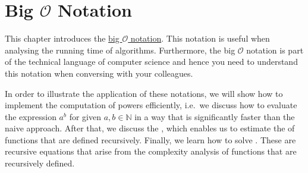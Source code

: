 \chapter{Big $\mathcal{O}$ Notation} 
This chapter introduces the
\href{http://en.wikipedia.org/wiki/O_notation}{big $\mathcal{O}$ notation}. 
This  notation is useful when analysing the running time of algorithms.  Furthermore, the big $\mathcal{O}$
notation is part of the technical language of computer science and hence you need to understand this notation
when conversing with your colleagues.

In order to illustrate the application of these notations, we will show how to implement the computation of
powers efficiently, i.e.~we discuss how to evaluate the expression $a^b$ for given $a,b \in \mathbb{N}$ in a way that
is significantly faster than the naive approach.  After that, we discuss the , which
enables us to estimate the  of functions that are defined recursively.  Finally, we learn how to solve
.  These are recursive equations that arise from the complexity analysis of
functions that are recursively defined.

